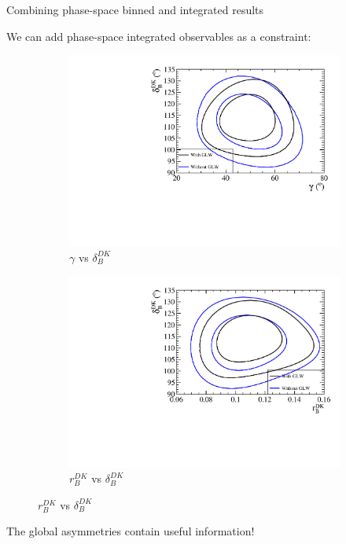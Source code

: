 \documentclass[xcolor={dvipsnames}]{beamer}
\begin{document}
\begin{frame}{Combining phase-space binned and integrated results}
  \begin{center}
    We can add phase-space integrated observables as a constraint:
  \end{center}
  \begin{figure}
    \centering
    \begin{subfigure}{0.50\textwidth}
      \centering
      \includegraphics[width=1.0\textwidth]{Plots/GLW_constraints_comparison_gamma_deltaB.pdf}
      \caption*{$\gamma$ vs $\delta_B^{DK}$}
    \end{subfigure}%
    \begin{subfigure}{0.50\textwidth}
      \centering
      \includegraphics[width=1.0\textwidth]{Plots/GLW_constraints_comparison_rB_deltaB.pdf}
      \caption*{$r_B^{DK}$ vs $\delta_B^{DK}$}
    \end{subfigure}
  \end{figure}
  \vspace{-0.3cm}
  \begin{center}
    The global asymmetries contain useful information!
  \end{center}
\end{frame}
\end{document}
